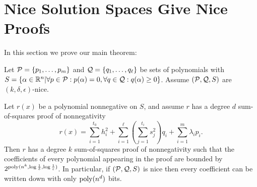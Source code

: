 \section{Nice Solution Spaces Give Nice Proofs}
\label{sec:main}

In this section we prove our main theorem:

\begin{theorem}\label{thm:main}
Let $\mathcal P = \{p_1,\dots,p_m\}$ and $\mathcal Q = \{q_1, \dots, q_\ell\}$ be sets of polynomials with $S = \{\alpha \in \mathbb R^n | \forall p \in \mathcal P: p(\alpha) = 0, \forall q \in \mathcal Q: q(\alpha) \geq 0\}$. Assume $(\mathcal P, \mathcal Q, S)$ are $(k,\delta,\epsilon)$-nice.

Let $r(x)$ be a polynomial nonnegative on $S$, and assume $r$ has a degree $d$ sum-of-squares proof of nonnegativity 
\[r(x) = \sum_{i=1}^{t_0} h_i^2 + \sum_{i=1}^\ell \left(\sum_{j=1}^{t_i} s_j^2\right) q_i + \sum_{i=1}^m \lambda_i p_i.\] 
Then $r$ has a degree $k$ sum-of-squares proof of nonnegativity such that the coefficients of every polynomial appearing in the proof are bounded by $2^{\operatorname{poly}(n^k,\log \frac{1}{\delta},\log \frac{1}{\varepsilon})}$. In particular, if $(\mathcal P, \mathcal Q, S)$ is nice then every coefficient can be written down with only $\operatorname{poly}(n^d)$ bits. 
\end{theorem}
